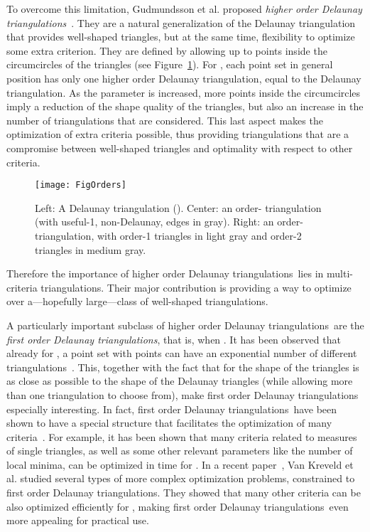 \documentclass {journal}
\newcommand {\hodts}{higher order Delaunay triangulations}
\newcommand {\fodts}{first order Delaunay triangulations}
\begin{document}
To overcome this limitation, Gudmundsson et al. proposed
\emph{\hodts}~\cite{ghk-hodt-02}. They are a natural
generalization of the Delaunay triangulation that provides
well-shaped triangles, but at the same time,  flexibility to
optimize some extra criterion. They are defined by allowing up to
 points inside the circumcircles of the triangles (see Figure~\ref{fig:FigOrders}). For ,
each point set in general position has only one higher order
Delaunay triangulation, equal to the Delaunay triangulation. As
the parameter  is increased, more points inside the
circumcircles imply a reduction of the shape quality of the
triangles, but also an increase in the number of triangulations
that are considered. This last aspect makes the optimization of
extra criteria possible, thus providing triangulations that are a
compromise between well-shaped triangles and optimality with
respect to other criteria.



   \begin{figure}[tb]
\centering
\texttt{[image: FigOrders]}
\caption{Left: A Delaunay triangulation (). Center: an
order- triangulation (with useful-1, non-Delaunay, edges in
gray). Right: an order- triangulation, with order-1 triangles
in light gray and order-2 triangles in medium gray.}
\label{fig:FigOrders}
\end{figure}


Therefore the importance of \hodts\ lies in multi-criteria
triangulations. Their major contribution is providing a way to
optimize over a---hopefully large---class of well-shaped
triangulations.

A particularly important subclass of \hodts\ are the
\emph{\fodts}, that is, when . It has been observed that
already for , a point set with  points can have an
exponential number of different triangulations~\cite{s-opt-09}.
This, together with the fact that for  the shape of the
triangles is as close as possible to the shape of the Delaunay
triangles (while allowing more than one triangulation to choose
from), make first order Delaunay triangulations especially
interesting. In fact, \fodts\ have been shown to have a special
structure that facilitates the optimization of many
criteria~\cite{ghk-hodt-02}. For example, it has been shown that
many criteria related to measures of single triangles, as well as
some other relevant parameters like the number of local minima,
can be optimized in  time for . In a recent
paper~\cite{kls-ofodt-09}, Van Kreveld et al. studied several
types of more complex optimization problems, constrained to
\fodts. They showed that many other criteria can be also optimized
efficiently for , making \fodts\ even more appealing for
practical use.
\end{document}
